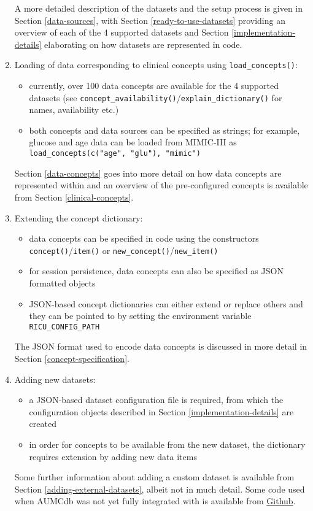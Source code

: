 \documentclass[
  notitle]{jss}
\begin{document}
\begin{enumerate}
  A more detailed description of the datasets and the setup process is
  given in Section \ref{data-sources}, with Section
  \ref{ready-to-use-datasets} providing an overview of each of the 4
  supported datasets and Section \ref{implementation-details}
  elaborating on how datasets are represented in code.
\item
  Loading of data corresponding to clinical concepts using
  \texttt{load\_concepts()}:

  \begin{itemize}
  \item
    currently, over 100 data concepts are available for the 4 supported
    datasets (see
    \texttt{concept\_availability()}/\texttt{explain\_dictionary()} for
    names, availability etc.)
  \item
    both concepts and data sources can be specified as strings; for
    example, glucose and age data can be loaded from MIMIC-III as
    \texttt{load\_concepts(c("age",\ "glu"),\ "mimic")}
  \end{itemize}

  Section \ref{data-concepts} goes into more detail on how data concepts
  are represented within  and an overview of the
  pre-configured concepts is available from Section
  \ref{clinical-concepts}.
\item
  Extending the concept dictionary:

  \begin{itemize}
  \item
    data concepts can be specified in code using the constructors
    \texttt{concept()}/\texttt{item()} or
    \texttt{new\_concept()}/\texttt{new\_item()}
  \item
    for session persistence, data concepts can also be specified as JSON
    formatted objects
  \item
    JSON-based concept dictionaries can either extend or replace others
    and they can be pointed to by setting the environment variable
    \texttt{RICU\_CONFIG\_PATH}
  \end{itemize}

  The JSON format used to encode data concepts is discussed in more
  detail in Section \ref{concept-specification}.
\item
  Adding new datasets:

  \begin{itemize}
  \item
    a JSON-based dataset configuration file is required, from which the
    configuration objects described in Section
    \ref{implementation-details} are created
  \item
    in order for concepts to be available from the new dataset, the
    dictionary requires extension by adding new data items
  \end{itemize}

  Some further information about adding a custom dataset is available
  from Section \ref{adding-external-datasets}, albeit not in much
  detail. Some code used when AUMCdb was not yet fully integrated with
   is available from
  \href{https://github.com/eth-mds/aumc}{Github}.
\end{enumerate}
\end{document}
